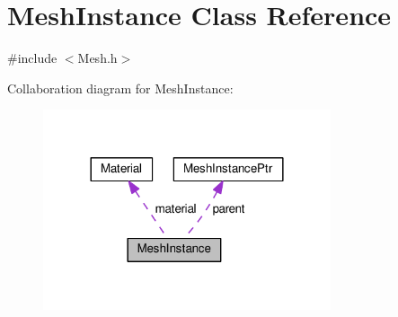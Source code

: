 \hypertarget{class_mesh_instance}{}\section{Mesh\+Instance Class Reference}
\label{class_mesh_instance}


{\ttfamily \#include $<$Mesh.\+h$>$}



Collaboration diagram for Mesh\+Instance\+:\nopagebreak
\begin{figure}[H]
\begin{center}
\leavevmode
\includegraphics[width=240pt]{class_mesh_instance__coll__graph}
\end{center}
\end{figure}
